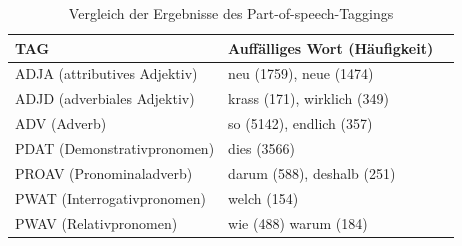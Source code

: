 \begin{table}[h]
    \caption{Vergleich der Ergebnisse des Part-of-speech-Taggings}
    \label{pos}
    \renewcommand{\arraystretch}{1.2}
    \centering
    \sffamily
    \begin{footnotesize}
        \begin{tabular}{l l l}
            \toprule
            \textbf{TAG}                  & \textbf{Auffälliges Wort (Häufigkeit)} \\
            \midrule
            ADJA  (attributives Adjektiv) & neu (1759), neue (1474)                \\
            ADJD   (adverbiales Adjektiv) & krass (171), wirklich  (349)           \\
            ADV   (Adverb)                & so (5142), endlich (357)               \\
            PDAT (Demonstrativpronomen)   & dies (3566)                            \\
            PROAV   (Pronominaladverb)    & darum (588), deshalb (251)             \\
            PWAT (Interrogativpronomen)   & welch (154)                            \\
            PWAV  (Relativpronomen)       & wie (488) warum (184)                  \\
            \bottomrule
        \end{tabular}
    \end{footnotesize}
    \rmfamily
\end{table}






